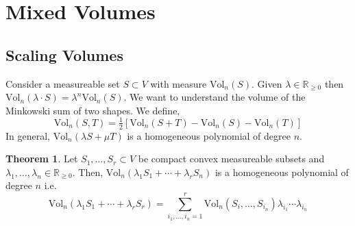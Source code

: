 \documentclass[12pt]{extarticle}
\newcommand{\R}{\mathbb{R}}
\theoremstyle{definition}
\newtheorem{theorem}{Theorem}[section]
\newcommand{\Vol}[2]{\mathrm{Vol}_{#1}\left( #2 \right)}
\begin{document}
\section{Mixed Volumes}

\subsection{Scaling Volumes}

Consider a measureable set $S \subset V$ with measure $\Vol{n}{S}$. Given $\lambda \in \R_{\ge 0}$ then $\Vol{n}{\lambda \cdot S} = \lambda^n \Vol{n}{S}$. We want to understand the volume of the Minkowski sum of two shapes. We define,
\[ \Vol{n}{S, T} = \tfrac{1}{2} \left[ \Vol{n}{S + T} - \Vol{n}{S} - \Vol{n}{T} \right] \]
In general, $\Vol{n}{\lambda S + \mu T}$ is a homogeneous polynomial of degree $n$. 		

\begin{theorem}
Let $S_1, \dots, S_r \subset V$ be compact convex measureable subsets and $\lambda_1, \dots, \lambda_n \in \R_{\ge 0}$. Then, $\Vol{n}{\lambda_1 S_1 + \cdots + \lambda_r S_n}$ is a homogeneous polynomial of degree $n$ i.e.
\[  \Vol{n}{\lambda_1 S_1 + \cdots + \lambda_r S_r} = \sum_{i_1, \dots, i_n = 1}^r \Vol{n}{S_i, \dots, S_{i_n}} \lambda_{i_1} \cdots \lambda_{i_n} \]
\end{theorem}
\end{document}

